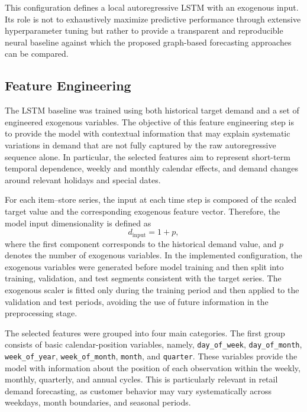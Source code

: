This configuration defines a local autoregressive LSTM with an exogenous input. Its role is not to exhaustively maximize predictive performance through extensive hyperparameter tuning but rather to provide a transparent and reproducible neural baseline against which the proposed graph-based forecasting approaches can be compared.



\subsection{Feature Engineering}
\label{subsec:lstm_feature_engineering}

The LSTM baseline was trained using both historical target demand and a set of engineered exogenous variables. The objective of this feature engineering step is to provide the model with contextual information that may explain systematic variations in demand that are not fully captured by the raw autoregressive sequence alone. In particular, the selected features aim to represent short-term temporal dependence, weekly and monthly calendar effects, and demand changes around relevant holidays and special dates.

For each item--store series, the input at each time step is composed of the scaled target value and the corresponding exogenous feature vector. Therefore, the model input dimensionality is defined as
\[
d_{\text{input}} = 1 + p,
\]
where the first component corresponds to the historical demand value, and \(p\) denotes the number of exogenous variables. In the implemented configuration, the exogenous variables were generated before model training and then split into training, validation, and test segments consistent with the target series. The exogenous scaler is fitted only during the training period and then applied to the validation and test periods, avoiding the use of future information in the preprocessing stage.

The selected features were grouped into four main categories. The first group consists of basic calendar-position variables, namely, \texttt{day\_of\_week}, \texttt{day\_of\_month}, \texttt{week\_of\_year}, \texttt{week\_of\_month}, \texttt{month}, and \texttt{quarter}. These variables provide the model with information about the position of each observation within the weekly, monthly, quarterly, and annual cycles. This is particularly relevant in retail demand forecasting, as customer behavior may vary systematically across weekdays, month boundaries, and seasonal periods.


